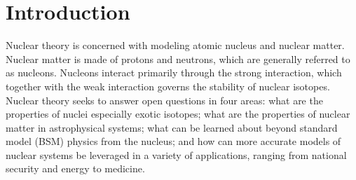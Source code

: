 \chapter{Introduction}



Nuclear theory is concerned with modeling atomic nucleus and nuclear matter. Nuclear matter is made of protons and neutrons, which are generally referred to as nucleons. Nucleons interact primarily through the strong interaction, which together with the weak interaction governs the stability of nuclear isotopes. Nuclear theory seeks to answer open questions in four areas: what are the properties of nuclei especially exotic isotopes; what are the properties of nuclear matter in astrophysical systems; what can be learned about beyond standard model (BSM) physics from the nucleus; and how can more accurate models of nuclear systems be leveraged in a variety of applications, ranging from national security and energy to medicine.

